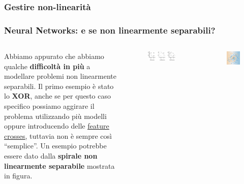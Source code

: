 \subsubsection[Gestire non-linearità]{Gestire non-linearità}
\begin{frame}

	\frametitle{Neural Networks: e se non linearmente separabili?}

	\begin{columns}
		Abbiamo appurato che abbiamo qualche \textbf{difficoltà in più} a modellare problemi non linearmente separabili.
		\newlinedouble
		Il primo esempio è stato lo \textbf{XOR}, anche se per questo caso specifico possiamo aggirare il problema utilizzando più modelli oppure introducendo delle \underline{\href{https://developers.google.com/machine-learning/crash-course/feature-crosses/encoding-nonlinearity}{feature crosses}}, tuttavia non è sempre così ``semplice''.
		\newlinedouble
		Un esempio potrebbe essere dato dalla \textbf{spirale non linearmente separabile} mostrata in figura.

		\begin{figure}[!htbp]
			\centering
			\includegraphics[width=1.0\linewidth]{images/supervised/z_algorithms_neural_networks/xor.jpg}
		\end{figure}
		\begin{figure}[!htbp]
			\centering
			\includegraphics[width=0.7\linewidth]{images/supervised/z_algorithms_neural_networks/NonLinearSpiral.png}
		\end{figure}
	\end{columns}


\end{frame}


